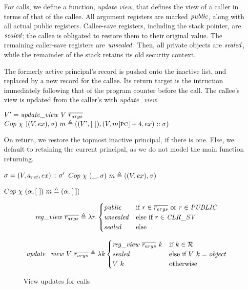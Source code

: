 \documentclass[10pt,conference]{ieeetran}%
\theoremstyle{definition}
\begin{document}
For calls, we define a function, {\it update view}, that defines the view
of a caller in terms of that of the callee. All argument registers are marked
\(\mathit{public}\), along with all actual public registers. Callee-save registers,
including the stack pointer, are \(\mathit{sealed}\); the callee is obligated to restore
them to their original value. The remaining caller-save registers are \(\mathit{unsealed}\).
Then, all private objects are \(\mathit{sealed}\), while the remainder of the stack retains
its old security context.

The formerly active principal's record is pushed onto the inactive list,
and replaced by a new record for the callee. Its return target is the intruction
immediately following that of the program counter before the call.
The callee's view is updated from the caller's with {\it update\_view}.

            {\(V' = \mathit{update\_view} ~ V ~ \overline{r_{args}}\)}
            {\(Cop ~ \chi ~ ((V,ex),\sigma) ~ m \triangleq
                ((V',[~]),(V, m[\textsc{pc}]+4, ex)::\sigma)\)}

On return, we restore the topmost inactive principal, if there is one.
Else, we default to retaining the current principal, as we do not model
the main function returning.

            {\(\sigma = (V,a_{ret},ex)::\sigma'\)}
            {\(Cop ~ \chi ~ (\_, \sigma) ~ m \triangleq
              ((V,ex), \sigma)\)}

         {\(Cop ~ \chi ~ (\alpha, [~]) ~ m \triangleq
           (\alpha, [~])\)}

\begin{figure*}
  \[\mathit{reg\_view} ~ \overline{r_{args}} \triangleq \lambda r .
  \begin{cases}
    \mathit{public} & \textnormal{if } r \in \overline{r_{args}} \textnormal{ or } r \in \mathit{PUBLIC} \\
    \mathit{unsealed} & \textnormal{else if } r \in \mathit{CLR\_SV} \\
    \mathit{sealed} & \textnormal{else} \\
  \end{cases}\] 

  \[\mathit{update\_view} ~ V ~ \overline{r_{args}} \triangleq \lambda k
  \begin{cases}
    \mathit{reg\_view} ~ \overline{r_{args}} ~ k & \textnormal{if } k \in {\mathcal R} \\
    \mathit{sealed} & \textnormal{else if } V ~ k = \mathit{object} \\
    
      V ~ k & \textnormal{otherwise} \\
  \end{cases}\]

\caption{View updates for calls}
\label{fig:callcontexts}
\end{figure*}
\end{document}
